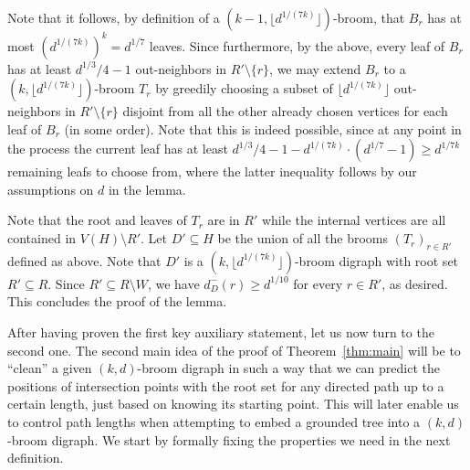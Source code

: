 \documentclass[a4paper,11pt]{article}
\makeatletter
\renewenvironment{proof}[1][\proofname] {\par\pushQED{\qed}\normalfont\topsep6\p@\@plus6\p@\relax\trivlist\item[\hskip\labelsep\bfseries#1\@addpunct{.}]\ignorespaces}{\popQED\endtrivlist\@endpefalse}
\theoremstyle{definition}
\makeatother
\begin{document}
\begin{proof}
    Note that it follows, by definition of a $(k-1,\lfloor d^{1/(7k)}\rfloor)$-broom, that $B_r$ has at most $(d^{1/(7k)})^k=d^{1/7}$ leaves. Since furthermore, by the above, every leaf of $B_r$ has at least $d^{1/3}/4-1$ out-neighbors in $R'\setminus \{r\}$, we may extend $B_r$ to a $(k,\lfloor d^{1/(7k)}\rfloor)$-broom $T_r$ by greedily choosing a subset of $\lfloor d^{1/(7k)}\rfloor$ out-neighbors in $R'\setminus \{r\}$ disjoint from all the other already chosen vertices for each leaf of $B_r$ (in some order). Note that this is indeed possible, since at any point in the process the current leaf has at least $d^{1/3}/4-1-d^{1/(7k)}\cdot (d^{1/7}-1)\ge d^{1/7k}$ remaining leafs to choose from, where the latter inequality follows by our assumptions on $d$ in the lemma.
    
    Note that the root and leaves of $T_r$ are in $R'$ while the internal vertices are all contained in $V(H)\setminus R'$. Let $D'\subseteq H$ be the union of all the brooms $(T_r)_{r\in R'}$ defined as above. Note that $D'$ is a $(k,\lfloor d^{1/(7k)}\rfloor)$-broom digraph with root set $R'\subseteq R$. Since $R'\subseteq R\setminus W$, we have $d_D^-(r)\ge d^{1/10}$ for every $r\in R'$, as desired. This concludes the proof of the lemma.
\end{proof}

After having proven the first key auxiliary statement, let us now turn to the second one. The second main idea of the proof of Theorem~\ref{thm:main} will be to ``clean'' a given $(k,d)$-broom digraph in such a way that we can predict the positions of intersection points with the root set for any directed path up to a certain length, just based on knowing its starting point. This will later enable us to control path lengths when attempting to embed a grounded tree into a $(k,d)$-broom digraph. We start by formally fixing the properties we need in the next definition. 
\end{document}

